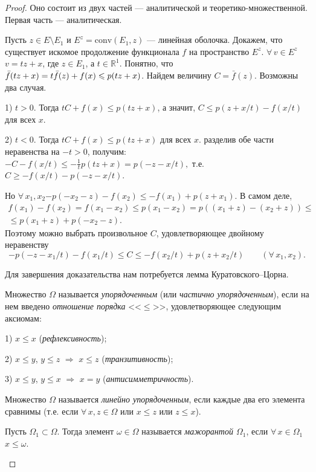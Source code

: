 \documentclass[10pt,titlepage, a4paper]{article}
\begin{document}
\begin{proof} Оно состоит из двух частей --- аналитической и
теоре\-ти\-ко-множественной. Первая часть --- аналитическая.

Пусть $z\in E\setminus E_1$ и $E^z=\mathrm{conv}(E_1,z)$
--- линейная оболочка. Докажем, что существует искомое продолжение
функционала $f$ на пространство $E^z$. $\forall\,v\in
E^z$\;\;$v=tz+x$, где $z\in E_1$, а $t\in\mathbb{R}^1$. Понятно, что
$\bar{f}(tz+x)\p=t\bar{f}(z)+f(x)\leqslant p(tz+x)$. Найдем величину
$C=\bar{f}(z)$. Возможны два случая.

1) $t>0$. Тогда $tC+f(x)\leqslant p(tz+x)$, а значит, $C\leqslant
p(z+x/t)-f(x/t)$ для всех $x$.

2) $t<0$. Тогда $tC+f(x)\leqslant p(tz+x)$ для всех $x$. разделив
обе части неравенства на $-t>0$, получим: $-C-f(x/t)\leqslant
-\frac{1}{t}p(tz+x)=p(-z-x/t),$ т.е. $C\geqslant -f(x/t)-p(-z-x/t)$.

Но $\forall\,x_1,x_2$\;\;$-p(-x_2-z)-f(x_2)\leqslant
-f(x_1)+p(z+x_1)$. В самом деле,
\begin{multline*}
f(x_1)-f(x_2)=f(x_1-x_2)\leqslant p(x_1-x_2)=p((x_1+z)-(x_2+z))\leqslant\\
\leqslant p(x_1+z)+p(-x_2-z).
\end{multline*}
Поэтому можно выбрать произвольное $C$, удовлетворяющее двойному
неравенству
$$-p(-z-x_1/t)-f(x_1/t)\leqslant C\leqslant -f(x_2/t)+p(z+x_2/t)\qquad
(\forall\,x_1,x_2).$$

Для завершения доказательства нам потребуется лемма
Куратовско\-го--Цорна.

\begin{defen}
Множество $\Omega$ называется \emph{упорядоченным} (или
\emph{частично упорядоченным}), если на нем введено \emph{отношение
порядка} <<$\leqslant$>>, удовлетворяющее следующим аксиомам:

1) $x\leqslant x$ (\emph{рефлексивность});

2) $x\leqslant y$, $y\leqslant z$ $\Rightarrow$ $x\leqslant z$
(\emph{транзитивность});

3) $x\leqslant y$, $y\leqslant x$ $\Rightarrow$ $x=y$
(\emph{антисимметричность}).

Множество $\Omega$ называется \emph{линейно упорядоченным}, если
каждые два его элемента сравнимы (т.е. если $\forall\,x,z\in\Omega$
или $x\leqslant z$ или $z\leqslant x$).

Пусть $\Omega_1\subset\Omega$. Тогда элемент $\omega\in\Omega$
называется \emph{мажорантой $\Omega_1$}, если
$\forall\,x\in\Omega_1$\;\;$x\leqslant\omega$.


\end{defen}
\end{proof}
\end{document}
